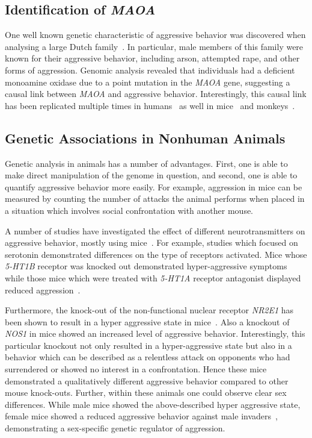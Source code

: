 \subsection{Identification of \textit{MAOA}}
\label{sub:identification_of_MAOA}

One well known genetic characteristic of aggressive behavior was discovered when analysing a large Dutch family~\cite{Brunner1993}.
In particular, male members of this family were known for their aggressive behavior, including arson, attempted rape, and other forms of aggression.
Genomic analysis revealed that individuals had a deficient monoamine oxidase due to a point mutation in the \textit{MAOA} gene, suggesting a causal link between \textit{MAOA} and aggressive behavior.
Interestingly, this causal link has been replicated multiple times in humans~\cite{Huang2004,Manuck2000} as well in mice~\cite{Cases1995} and monkeys~\cite{Newman2005}.

\subsection{Genetic Associations in Nonhuman Animals}
\label{sub:genetic_associations_in_animals}

Genetic analysis in animals has a number of advantages.
First, one is able to make direct manipulation of the genome in question, and second, one is able to quantify aggressive behavior more easily.
For example, aggression in mice can be measured by counting the number of attacks the animal performs when placed in a situation which involves social confrontation with another mouse.

A number of studies have investigated the effect of different neurotransmitters on aggressive behavior, mostly using mice~\cite{Anholt2012}.
For example, studies which focused on serotonin demonstrated differences on the type of receptors activated.
Mice whose \textit{5-HT1B} receptor was knocked out demonstrated hyper-aggressive symptoms while those mice which were treated with \textit{5-HT1A} receptor antagonist displayed reduced aggression~\cite{Saudou1994,Bell1994}.

Furthermore, the knock-out of the non-functional nuclear receptor \textit{NR2E1} has been shown to result in a hyper aggressive state in mice~\cite{Young2002}.
Also a knockout of \textit{NOS1} in mice showed an increased level of aggressive behavior.
Interestingly, this particular knockout not only resulted in a hyper-aggressive state but also in a behavior which can be described as a relentless attack on opponents who had surrendered or showed no interest in a confrontation.
Hence these mice demonstrated a qualitatively different aggressive behavior compared to other mouse knock-outs.
Further, within these animals one could observe clear sex differences.
While male mice showed the above-described hyper aggressive state, female mice showed a reduced aggressive behavior against male invaders~\cite{Gammie1999,Nelson1995}, demonstrating a sex-specific genetic regulator of aggression.

